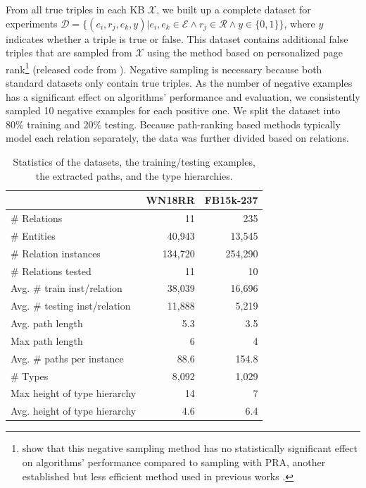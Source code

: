 \documentclass[letterpaper]{article} %
\begin{document}
From all true triples in each KB $\mathcal{X}$, we built up a complete dataset for experiments $\mathcal{D} = \{ (e_i, r_j, e_k, y)|e_i, e_k\in \mathcal{E} \land  r_j \in \mathcal{R} \land y \in \{0, 1\}\}$, where $y$ indicates whether a triple is true or false. This dataset contains additional false triples that are sampled from $\mathcal{X}$ using the method based on personalized page rank\footnote{\citeauthor{sfe} show that this negative sampling method has no statistically significant effect on algorithms' performance compared to sampling with PRA, another established but less efficient method used in previous works \cite{pra,deeppath}.} (released code from \cite{sfe}). Negative sampling is necessary because both standard datasets only contain true triples. As the number of negative examples has a significant effect on algorithms' performance \cite{baselines_strike_back} and evaluation, we consistently sampled 10 negative examples for each positive one. We split the dataset into 80\% training and 20\% testing. Because path-ranking based methods typically model each relation separately, the data was further divided based on relations.





\begin{table}
\centering
\begin{tabular}{lrr}
\toprule
  & WN18RR & FB15k-237 \\
\midrule
\# Relations       & 11  &  235   \\
\# Entities            & 40,943  &   13,545   \\
\# Relation instances    &  134,720  &   254,290    \\
\midrule
\# Relations tested  & 11  &   10   \\
Avg. \# train inst/relation  & 38,039  &   16,696    \\
Avg. \# testing inst/relation  &  11,888 &   5,219    \\
\midrule
Avg. path length  & 5.3  &   3.5    \\
Max path length  & 6  &  4     \\
Avg. \# paths per instance & 88.6  &   154.8    \\
\midrule
\# Types & 8,092 & 1,029 \\
Max height of type hierarchy  & 14  &   7    \\
Avg. height of type hierarchy  & 4.6  &   6.4    \\
\bottomrule
\end{tabular}
\caption{Statistics of the datasets, the training/testing examples, the extracted paths, and the type hierarchies.}
\label{tab:data_stats}
\end{table}
\end{document}
